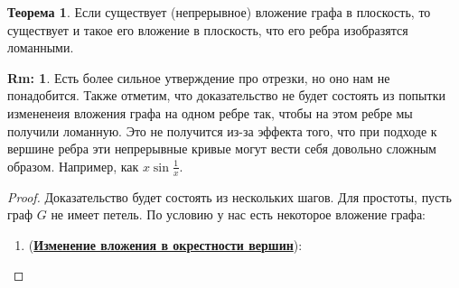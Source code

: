 \documentclass[12pt]{article}
\theoremstyle{definition}
\newtheorem{rem}{Rm:}
\newtheorem{theorem}{Теорема}
\begin{document}
\begin{theorem}
	Если существует (непрерывное) вложение графа в плоскость, то существует и такое его вложение в плоскость, что его ребра изобразятся ломанными.
\end{theorem}
\begin{rem}
	Есть более сильное утверждение про отрезки, но оно нам не понадобится. Также отметим, что доказательство не будет состоять из попытки измененеия вложения графа на одном ребре так, чтобы на этом ребре мы получили ломанную. Это не получится из-за эффекта того, что при подходе к вершине ребра эти непрерывные кривые могут вести себя довольно сложным образом. Например, как $x \sin{\tfrac{1}{x}}$.
\end{rem}
\begin{proof}
	Доказательство будет состоять из нескольких шагов. Для простоты, пусть граф $G$ не имеет петель. По условию у нас есть некоторое вложение графа:
	\begin{enumerate}[label ={\arabic*)}]
		\item (\uline{\textbf{Изменение вложения в окрестности вершин}}):
		

\end{enumerate}
\end{proof}
\end{document}

